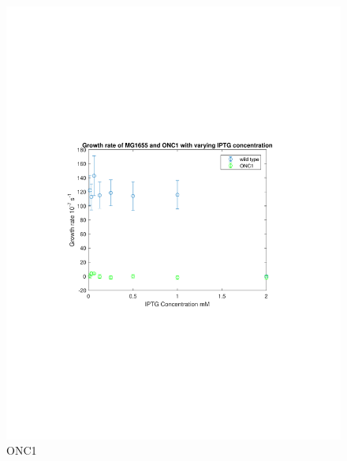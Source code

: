 \documentclass[english,11pt,a4paper]{article}
\begin{document}
\begin{figure}[htbp]
\centering
\includegraphics[scale=0.6]{ONC1growthrate.pdf}
\caption{ONC1}
\label{fig:GrowthrateODONC1}
\end{figure}
\end{document}
